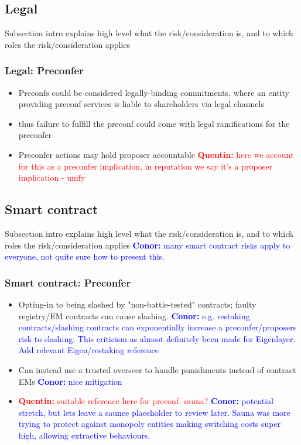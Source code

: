 \documentclass[a4paper]{article}
\theoremstyle{boldstyle}
\newcommand{\cm}[1]{\textcolor{blue}{\textbf{Conor:} #1}}
\newcommand{\qb}[1]{\textcolor{red}{\textbf{Quentin:} #1}}
\begin{document}
\subsection{Legal}
    Subsection intro explains high level what the risk/consideration is, and to which roles the risk/consideration applies

    \subsubsection{Legal: Preconfer}
        \begin{itemize}
            \item Preconfs could be considered legally-binding commitments, where an entity providing preconf services is liable to shareholders via legal channels 
            \item thus failure to fulfill the preconf could come with legal ramifications for the preconfer 
            \item Preconfer actions may hold proposer accountable \qb{here we account for this as a preconfer implication, in reputation we say it's a proposer implication - unify}
        \end{itemize}

\subsection{Smart contract}
         
    Subsection intro explains high level what the risk/consideration is, and to which roles the risk/consideration applies
    \cm{many smart contract risks apply to everyone, not quite sure how to present this.}


    \subsubsection{Smart contract: Preconfer}
        \begin{itemize}
            \item Opting-in to being slashed by "non-battle-tested" contracts; faulty registry/EM contracts can cause slashing. \cm{e.g. restaking contracts/slashing contracts can exponentially increase a preconfer/proposers risk to slashing. This criticism as almsot definitely been made for Eigenlayer. Add relevant Eigen/restaking reference}
            \item Can instead use a trusted overseer to handle punishments instead of contract EMs \cm{nice mitigation}
            \item \qb{suitable reference here for preconf. sauna?}  \cm{potential stretch, but lets leave a saunce placeholder to review later. Sauna was more trying to protect against monopoly entities making switching costs super high, allowing extractive behaviours.}
        \end{itemize}
    
\end{document}
